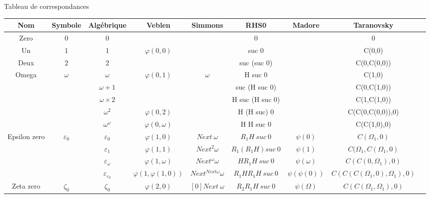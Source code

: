\documentclass[12pt]{beamer}
\begin{document}
\begin{frame}

Tableau de correspondances

\begin{changemargin}{-0.9cm}{0cm}

\fontsize{4pt}{5pt}\selectfont

\begin{tabular}{|c|c|c|c|c|c|c|c|c|}
\hline
Nom		& Symbole		& Algébrique			& Veblen			& Simmons			& RHS0		& Madore				& Taranovsky 			\\
\hline
Zero		& 0			& 0				& 				& 				& 0			& 					& 0				\\ \hline
Un		& 1			& 1				& \(\varphi(0,0)\)		& 				& suc 0			& 					& C(0,0)			\\ \hline
Deux		& 2			& 2				& 				& 				& suc (suc 0)		& 					& C(0,C(0,0))			\\ \hline
Omega		& \(\omega\)		& \(\omega\)			& \(\varphi(0,1)\)		& \(\omega\)			& H suc 0		& 					& C(1,0)			\\ \hline
		& 			& \(\omega+1\)			& 				& 				& suc (H suc 0)		& 					& C(0,C(1,0))			\\ \hline
		&			& \(\omega\times2\)		&				& 				& H suc (H suc 0)	& 					& C(1,C(1,0))			\\ \hline
		&			& \(\omega^2\)			& \(\varphi(0,2)\)		& 				& H (H suc) 0		& 					& C(C(0,C(0,0)),0)		\\ \hline
		&			& \(\omega^\omega\)		& \(\varphi(0,\omega)\)		& 				& H H suc 0		& 					& C(C(1,0),0)			\\ \hline
Epsilon zero	& \(\varepsilon_0\)	& \(\varepsilon_0\)		& \(\varphi(1,0)\)		& \(Next\ \omega\)		& \(R_1 H\ suc\ 0\)	& \(\psi(0)\)				& \(C(\Omega_1,0)\)		\\ \hline
		& 			& \(\varepsilon_1\)		& \(\varphi(1,1)\)		& \(Next^2 \omega\)	& \(R_1 (R_1 H) suc\ 0\)& \(\psi(1)\)				& \(C(\Omega_1,C(\Omega_1,0)\)	\\ \hline
		& 			& \(\varepsilon_\omega\)	& \(\varphi(1,\omega)\) 	& \(Next^\omega \omega\) & \(H R_1 H\ suc\ 0\)	& \(\psi(\omega)\)			& \(C(C(0,\Omega_1),0)\)	\\ \hline
		& 			&\(\varepsilon_{\varepsilon_0}\)& \(\varphi(1,\varphi(1,0))\)	& \(Next^{Next \omega} \omega \) & \(R_1 H R_1 H\ suc\ 0\)& \(\psi(\psi(0))\)			& \(C(C(C(\Omega_1,0),\Omega_1),0)\)\\ \hline
Zeta zero	& \(\zeta_0\)		& \(\zeta_0\)			& \(\varphi(2,0)\)		& \([0] Next\ \omega\)		& \(R_2 R_1 H\ suc\ 0\)	& \(\psi(\Omega)\)			& \(C(C(\Omega_1,\Omega_1),0)\)	\\ \hline

\end{tabular}
\end{changemargin}
\end{frame}
\end{document}
